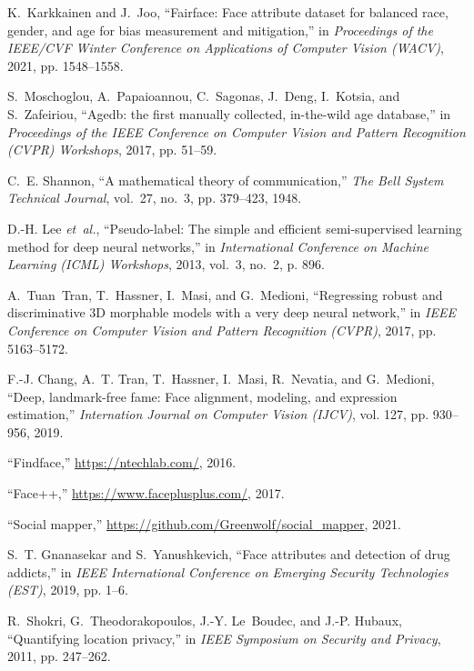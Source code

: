 \documentclass[journal]{IEEEtran}
\begin{document}
\begin{thebibliography}{100}
K.~Karkkainen and J.~Joo, ``Fairface: Face attribute dataset for balanced race, gender, and age for bias measurement and mitigation,'' in \emph{Proceedings
  of the IEEE/CVF Winter Conference on Applications of Computer Vision (WACV)}, 2021, pp. 1548--1558.

S.~Moschoglou, A.~Papaioannou, C.~Sagonas, J.~Deng, I.~Kotsia, and S.~Zafeiriou, ``Agedb: the first manually collected, in-the-wild age database,'' in \emph{Proceedings of the IEEE Conference on Computer Vision
  and Pattern Recognition (CVPR) Workshops}, 2017, pp. 51--59.

C.~E. Shannon, ``A mathematical theory of communication,'' \emph{The Bell System Technical Journal}, vol.~27, no.~3, pp. 379--423, 1948.

D.-H. Lee \emph{et~al.}, ``Pseudo-label: The simple and efficient semi-supervised learning method for deep neural networks,'' in \emph{International
  Conference on Machine Learning (ICML) Workshops}, 2013, vol.~3, no.~2, p. 896.

A.~Tuan~Tran, T.~Hassner, I.~Masi, and G.~Medioni, ``Regressing robust and discriminative 3D morphable models with a very deep neural network,'' in
  \emph{IEEE Conference on Computer Vision and Pattern Recognition (CVPR)}, 2017, pp. 5163--5172.

F.-J. Chang, A.~T. Tran, T.~Hassner, I.~Masi, R.~Nevatia, and G.~Medioni, ``Deep, landmark-free fame: Face alignment, modeling, and expression estimation,'' \emph{Internation Journal on Computer Vision (IJCV)}, vol. 127, pp. 930--956, 2019.

``Findface,'' \url{https://ntechlab.com/}, 2016.

``Face++,'' \url{https://www.faceplusplus.com/}, 2017.

``Social mapper,'' \url{https://github.com/Greenwolf/social\_mapper}, 2021.

S.~T. Gnanasekar and S.~Yanushkevich, ``Face attributes and detection of drug addicts,'' in \emph{IEEE International Conference on Emerging Security
  Technologies (EST)}, 2019, pp. 1--6.

R.~Shokri, G.~Theodorakopoulos, J.-Y. Le~Boudec, and J.-P. Hubaux,
  ``Quantifying location privacy,'' in \emph{IEEE Symposium on Security and Privacy}, 2011, pp. 247--262.


\end{thebibliography}
\end{document}
